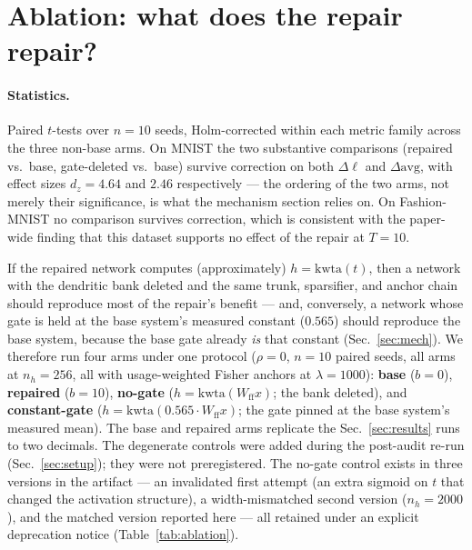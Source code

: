 \documentclass[review,12pt,number]{elsarticle}
\begin{document}
\section{Ablation: what does the repair repair?}
\label{sec:ablstat}

\paragraph{Statistics.} Paired $t$-tests over $n=10$ seeds, Holm-corrected within each metric family across the three non-base arms. On MNIST the two substantive comparisons (repaired vs.\ base, gate-deleted vs.\ base) survive correction on both $\Delta\ell$ and $\Delta\mathrm{avg}$, with effect sizes $d_z=4.64$ and $2.46$ respectively --- the ordering of the two arms, not merely their significance, is what the mechanism section relies on. On Fashion-MNIST no comparison survives correction, which is consistent with the paper-wide finding that this dataset supports no effect of the repair at $T=10$.
\label{sec:ablation}

If the repaired network computes (approximately) $h = \mathrm{kwta}(t)$,
then a network with the dendritic bank deleted and the same trunk,
sparsifier, and anchor chain should reproduce most of the repair's
benefit --- and, conversely, a network whose gate is held at the base
system's measured constant ($0.565$) should reproduce the base system,
because the base gate already \emph{is} that constant
(Sec.~\ref{sec:mech}). We therefore run four arms under one protocol
($\rho{=}0$, $n{=}10$ paired seeds, all arms at $n_h{=}256$, all with
usage-weighted Fisher anchors at $\lambda{=}1000$): \textbf{base}
($b{=}0$), \textbf{repaired} ($b{=}10$), \textbf{no-gate}
($h = \mathrm{kwta}(W_{\mathrm{ff}} x)$; the bank deleted), and
\textbf{constant-gate} ($h = \mathrm{kwta}(0.565 \cdot
W_{\mathrm{ff}} x)$; the gate pinned at the base system's measured
mean). The base and repaired arms replicate the Sec.~\ref{sec:results}
runs to two decimals. The degenerate controls were added during the
post-audit re-run (Sec.~\ref{sec:setup}); they were not
preregistered. The no-gate control exists in three versions in the
artifact --- an invalidated first attempt (an extra sigmoid on $t$ that
changed the activation structure), a width-mismatched second version
($n_h{=}2000$), and the matched version reported here --- all retained
under an explicit deprecation notice (Table~\ref{tab:ablation}).
\end{document}
